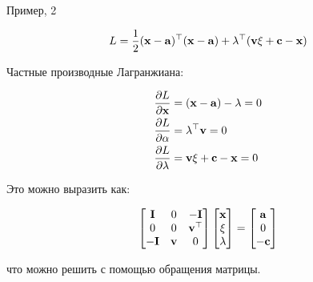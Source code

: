 \documentclass{beamer}
\begin{document}
\begin{frame}{Пример, 2}
	\begin{flushleft}
		
		\begin{equation}
			L =  \frac{1}{2}(\mathbf{x}- \mathbf{a})^\top(\mathbf{x}- \mathbf{a}) + \lambda^\top ( \mathbf{v} \xi + \mathbf{c} - \mathbf{x})
		\end{equation}
		
		Частные производные Лагранжиана:
		
		\begin{align}
			\frac{\partial L}{\partial \mathbf{x}} &=  (\mathbf{x}- \mathbf{a}) - \lambda = 0
			\\
			\frac{\partial L}{\partial \alpha} &=  \lambda^\top \mathbf{v} = 0
			\\
			\frac{\partial L}{\partial  \lambda} &=   \mathbf{v} \xi + \mathbf{c} - \mathbf{x} = 0
		\end{align}
		
		Это можно выразить как:
		
		\begin{align}
			\begin{bmatrix}
				\mathbf{I} & 0 & -\mathbf{I} 
				\\
				0 & 0 & \mathbf{v}^\top
				\\
				-\mathbf{I} & \mathbf{v} & 0
			\end{bmatrix}
			\begin{bmatrix}
				\mathbf{x} \\ \xi \\  \lambda
			\end{bmatrix}
			=
			\begin{bmatrix}
				\mathbf{a} \\ 0 \\  -\mathbf{c}
			\end{bmatrix}
		\end{align}
		
		что можно решить с помощью обращения матрицы.
		
	\end{flushleft}
\end{frame}
\end{document}
